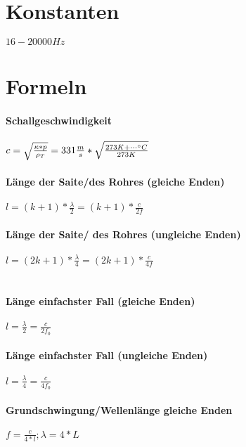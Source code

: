 \documentclass[12pt, a4paper]{scrreprt}
\begin{document}
\section{Konstanten}
 \(16 - 20000 Hz\)\\

\section{Formeln}
\paragraph{Schallgeschwindigkeit} \dotfill \(c = \sqrt{\frac{\kappa * p}{\rho_T}} = 331\frac{m}{s} * \sqrt{\frac{273K + \cdots \degree C}{273K}}\)
\paragraph{Länge der Saite/des Rohres (gleiche Enden)} \dotfill \(l = (k + 1) * \frac{\lambda}{2} = (k + 1) * \frac{c}{2f}\)\\
\myhspace {}
\paragraph{Länge der Saite/ des Rohres (ungleiche Enden)} \dotfill \(l = (2k+1) * \frac{\lambda}{4} = (2k+1) * \frac{c}{4f}\)\\
\myhspace {}\\
\myhspace {}
\paragraph{Länge einfachster Fall (gleiche Enden)} \dotfill \(l = \frac{\lambda}{2} = \frac{c}{2f_0}\)\\
\myhspace {}
\paragraph{Länge einfachster Fall (ungleiche Enden)} \dotfill \(l = \frac{\lambda}{4} = \frac{c}{4f_0}\)\\
\myhspace {}
\paragraph{Grundschwingung/Wellenlänge gleiche Enden} \dotfill \(f = \frac{c}{4*l} ; \lambda = 4 * L\)
\end{document}
